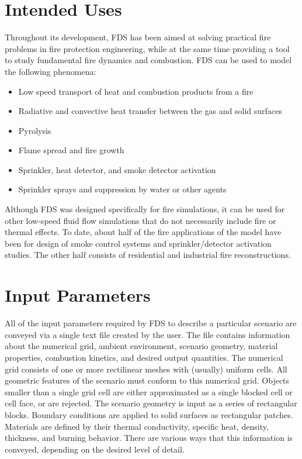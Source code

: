 \documentclass[11pt]{book}
\begin{document}
\section{Intended Uses}

Throughout its development, FDS has been aimed at solving practical fire problems in fire protection engineering, while at the same time providing a
tool to study fundamental fire dynamics and combustion. FDS can be used to model the following phenomena:
\begin{itemize}
\setlength{\itemsep}{0.0in}
\item Low speed transport of heat and combustion products from a fire
\item Radiative and convective heat transfer between the gas and solid surfaces
\item Pyrolysis
\item Flame spread and fire growth
\item Sprinkler, heat detector, and smoke detector activation
\item Sprinkler sprays and suppression by water or other agents
\end{itemize}
Although FDS was designed specifically for fire simulations, it can be used for other low-speed fluid flow simulations that do not necessarily include fire or thermal effects. To date, about half of the fire applications of the model have been for design of smoke control systems and sprinkler/detector activation studies. The other half consists of residential and industrial fire reconstructions.


\section{Input Parameters}

All of the input parameters required by FDS to describe a particular scenario are conveyed via a single text file created by the user. The file contains information about the numerical grid, ambient environment, scenario geometry, material properties, combustion kinetics, and desired output quantities. The numerical grid consists of one or more rectilinear meshes with (usually) uniform cells. All geometric features of the scenario must conform to this numerical grid. Objects smaller than a single grid cell are either approximated as a single blocked cell or cell face, or are rejected. The scenario geometry is input as a series of rectangular blocks. Boundary conditions are applied to solid surfaces as rectangular patches. Materials are defined by their thermal conductivity, specific heat, density, thickness, and burning behavior. There are various ways that this information is conveyed, depending on the desired level of detail.
\end{document}
